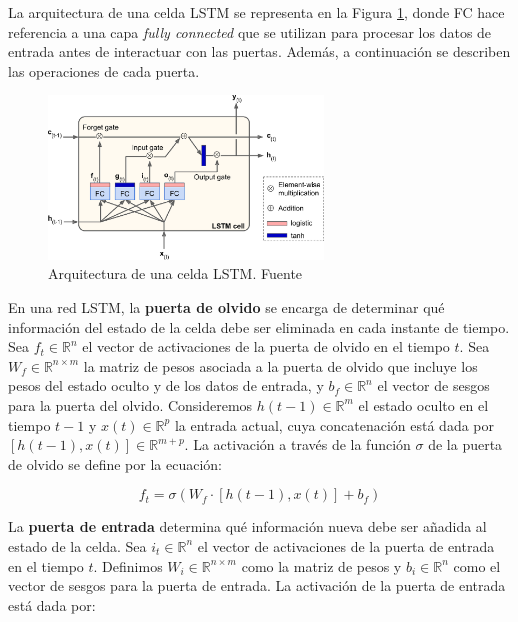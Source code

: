 La arquitectura de una celda LSTM se representa en la Figura \ref{fig:lstm}, donde FC hace referencia a una capa \textit{fully connected} que se utilizan para procesar los datos de entrada antes de interactuar con las puertas. Además, a continuación se describen las operaciones de cada puerta.
\begin{figure}[h]
    \centering
    \includegraphics[width=0.65\textwidth]{img/lstm.png}
    \caption{Arquitectura de una celda LSTM. Fuente \citep{geron2022hands}}
    \label{fig:lstm}
\end{figure}

En una red LSTM, la \textbf{puerta de olvido} se encarga de determinar qué información del estado de la celda debe ser eliminada en cada instante de tiempo. Sea \( f_t \in \mathbb{R}^n \) el vector de activaciones de la puerta de olvido en el tiempo \( t \). Sea \( W_f \in \mathbb{R}^{n \times m} \) la matriz de pesos asociada a la puerta de olvido que incluye los pesos del estado oculto y de los datos de entrada, y \( b_f \in \mathbb{R}^n \) el vector de sesgos para la puerta del olvido. Consideremos \( h(t-1) \in \mathbb{R}^m \) el estado oculto en el tiempo \( t-1 \) y \( x(t) \in \mathbb{R}^p \) la entrada actual, cuya concatenación está dada por \( [h(t-1), x(t)] \in \mathbb{R}^{m+p} \). La activación a través de la función $\sigma$ de la puerta de olvido se define por la ecuación:

\begin{equation}
    f_t = \sigma(W_f \cdot [h(t-1), x(t)] + b_f)
\end{equation}

La \textbf{puerta de entrada} determina qué información nueva debe ser añadida al estado de la celda. Sea \( i_t \in \mathbb{R}^n \) el vector de activaciones de la puerta de entrada en el tiempo \( t \). Definimos \( W_i \in \mathbb{R}^{n \times m} \) como la matriz de pesos y \( b_i \in \mathbb{R}^n \) como el vector de sesgos para la puerta de entrada. La activación de la puerta de entrada está dada por:

